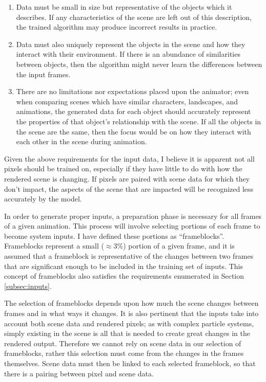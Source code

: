 \documentclass[conference]{IEEEtran}
\begin{document}
\begin{enumerate}
\item Data must be small in size but representative of the objects which it
describes. If any characteristics of the scene are left out of this
description, the trained algorithm may produce incorrect results in practice.
\item Data must also uniquely represent the objects in the scene and how they
interact with their environment.
If there is an abundance of similarities between objects, then
the algorithm might never learn the differences between the input frames.
\item There are no limitations nor expectations placed upon the animator;
even when comparing scenes which have similar characters, landscapes, and
animations, the generated data for each object should accurately represent
the properties of that object's relationship with the scene. If all the objects in the scene are the
same, then the focus would be on how they interact with each other in the scene
during animation.
\end{enumerate}

Given the above requirements for the input data,
I believe it is apparent not all pixels should be trained on, especially if they have
little to do with how the rendered scene is changing.
If pixels are paired with scene data for which they don't impact, the aspects of
the scene that are impacted will be recognized less accurately by the model.

In order to generate proper inputs,
a preparation phase is necessary for all frames of a given
animation. This process will involve selecting portions of each frame
to become system inputs.
I have defined these portions as ``frameblocks''.
Frameblocks represent a small ($\approx 3\%$) portion of a given frame,
and it is assumed
that a frameblock is representative of the changes between
two frames that are significant enough to
be included in the training set of inputs.
This concept of frameblocks also satisfies the
requirements enumerated in Section \ref{subsec:inputs}.

The selection of frameblocks depends upon how much the scene changes
between frames and in what ways it changes.
It is also pertinent that the inputs
take into account both scene data and rendered pixels;
as with complex particle systems, simply existing in the scene is all that is
needed to create great changes in the rendered output.
Therefore we cannot rely on scene data in our selection of frameblocks, rather
this selection must come from the changes in the frames themselves.
Scene data must then be linked to each selected frameblock, so that there is a
pairing between pixel and scene data.
\end{document}

